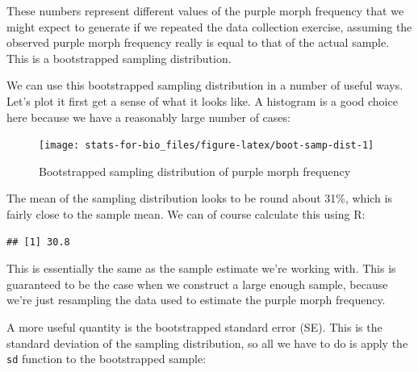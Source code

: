\documentclass[]{book}
\newenvironment{Shaded}{\begin{snugshade}}{\end{snugshade}}
\newcommand{\KeywordTok}[1]{\textcolor[rgb]{0.13,0.29,0.53}{\textbf{{#1}}}}
\newcommand{\DecValTok}[1]{\textcolor[rgb]{0.00,0.00,0.81}{{#1}}}
\newcommand{\StringTok}[1]{\textcolor[rgb]{0.31,0.60,0.02}{{#1}}}
\newcommand{\NormalTok}[1]{{#1}}
\begin{document}
These numbers represent different values of the purple morph frequency
that we might expect to generate if we repeated the data collection
exercise, assuming the observed purple morph frequency really is equal
to that of the actual sample. This is a bootstrapped sampling
distribution.

We can use this bootstrapped sampling distribution in a number of useful
ways. Let's plot it first get a sense of what it looks like. A histogram
is a good choice here because we have a reasonably large number of
cases:

\begin{figure}

{\centering \texttt{[image: stats-for-bio\_files/figure-latex/boot-samp-dist-1]} 

}

\caption{Bootstrapped sampling distribution of purple morph frequency}\label{fig:boot-samp-dist}
\end{figure}

The mean of the sampling distribution looks to be round about 31\%,
which is fairly close to the sample mean. We can of course calculate
this using R:

\begin{Shaded}
\end{Shaded}

\begin{verbatim}
## [1] 30.8
\end{verbatim}

This is essentially the same as the sample estimate we're working with.
This is guaranteed to be the case when we construct a large enough
sample, because we're just resampling the data used to estimate the
purple morph frequency.

A more useful quantity is the bootstrapped standard error (SE). This is
the standard deviation of the sampling distribution, so all we have to
do is apply the \texttt{sd} function to the bootstrapped sample:

\begin{Shaded}
\end{Shaded}
\end{document}
